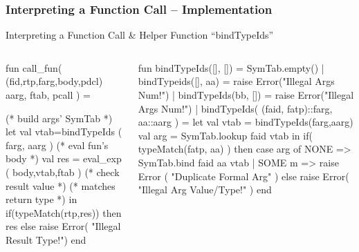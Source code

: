 \documentclass{beamer}
\newcommand{\emp}[1]{\textcolor{DikuRed}{ #1}}
\newcommand{\emphh}[1]{\textcolor{CosGreen}{ #1}}
\begin{document}
\begin{frame}[fragile, t]
\frametitle{Interpreting a Function Call -- Implementation}

\begin{block}{Interpreting a Function Call \& Helper Function ``bindTypeIds''}
\begin{columns}
\vspace{-2ex}
\begin{colorcode}[fontsize=\scriptsize]
fun \alert{call\_fun}(
  (fid,rtp,farg,body,pdcl)
  aarg, ftab, pcall    ) =

  \emp{(* build args' SymTab *)}
let val vtab=bindTypeIds (
                farg, aarg
              )
     \emp{(* eval fun's body *)}
    val res = eval\_exp (
            body,vtab,ftab
        )
 \emp{(* check result  value *)}
 \emp{(* matches return type *)}
in if(\alert{typeMatch(rtp,res)})
   then res
   else raise Error(
   "Illegal Result Type!")
end
\end{colorcode} 
\vspace{-2ex}
\begin{colorcode}[fontsize=\scriptsize]
fun \emphh{bindTypeIds}([], []) =
      SymTab.empty()
  | \emphh{bindTypeids}([], aa) =
      raise Error("Illegal Args Num!")
  | \emphh{bindTypeIds}(bb, []) =
      raise Error("Illegal Args Num!")
  | \emphh{bindTypeIds}( (faid, fatp)::farg,
                           aa::aarg )
= let val vtab = \emphh{bindTypeIds}(farg,aarg)
      val arg = SymTab.lookup faid vtab
  in if( \alert{typeMatch(fatp, aa)} )
     then case arg of
            NONE =>
              SymTab.bind faid aa vtab
          | SOME m => raise Error (
              "Duplicate Formal Arg" )
     else raise Error(
           "Illegal Arg Value/Type!" )
  end
\end{colorcode}
\end{columns}
\end{block}

\end{frame}
\end{document}
